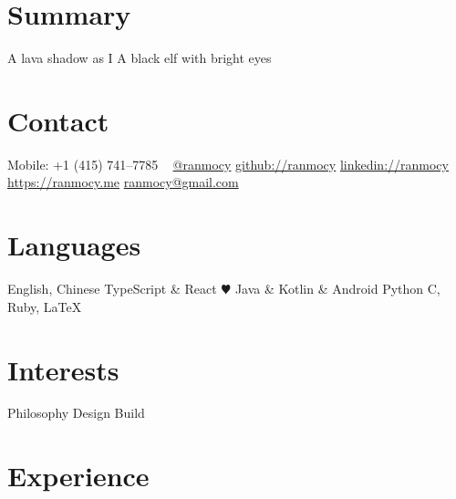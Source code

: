 \documentclass[]{friggeri-cv} %
\begin{document}


\begin{aside} %
  \section{Summary}
  A lava shadow as I
  A black elf
  with bright eyes
  \section{Contact}
  Mobile:
  +1 (415) 741--7785
  ~
  \href{https://twitter.com/ranmocy}{@ranmocy}
  \href{https://github.com/ranmocy}{github://ranmocy}
  \href{https://www.linkedin.com/in/ranmocy}{linkedin://ranmocy}
  \href{https://ranmocy.me}{https://ranmocy.me}
  \href{mailto:ranmocy+cv@gmail.com}{ranmocy@gmail.com}
  \section{Languages}
  English, Chinese
  TypeScript \& React {\color{red} $\varheartsuit$}
  Java \& Kotlin \& Android
  Python
  C, Ruby, LaTeX
  \section{Interests}
  Philosophy
  Design
  Build
\end{aside}


\section{Experience}
\end{document}
